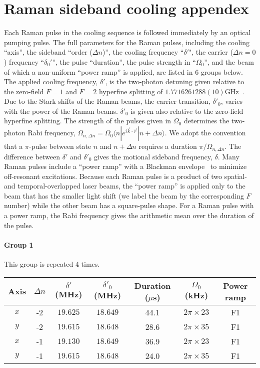 
\chapter{Raman sideband cooling appendex}
\label{appendex:rsc}

Each Raman pulse in the cooling sequence is followed immediately by an optical pumping pulse.
The full parameters for the Raman pulses, including the cooling ``axis'',
the sideband ``order ($\Delta n$)'', the cooling frequency ``$\delta '$",
the carrier ($\Delta n=0$) frequency ``$\delta_0'$'', the pulse ``duration'',
the pulse strength in ``$\Omega_0$'',
and the beam of which a non-uniform ``power ramp'' is applied, are listed in 6 groups below.
The applied cooling frequency, $\delta'$,
is the two-photon detuning given relative to the zero-field $F=1$ and $F=2$ hyperfine splitting
of $1.7716261288(10)$GHz~\cite{steck_sodium_nodate}.
Due to the Stark shifts of the Raman beams, the carrier transition, $\delta'_0$,
varies with the power of the Raman beams.
$\delta'_0$ is given also relative to the zero-field hyperfine splitting.
The strength of the pulses given in $\Omega_0$ determines the two-photon Rabi frequency,
$\Omega_{n,\Delta n}=\Omega_0 \langle n|e^{i \vec{k} \cdot \vec{r}}|n+\Delta n\rangle$.
We adopt the convention that a $\pi$-pulse between state $n$ and $n+\Delta n$ requires a duration $\pi/\Omega_{n,\Delta n}$.
The difference between $\delta'$ and $\delta'_0$ gives the motional sideband frequency, $\delta$.
Many Raman pulses include a ``power ramp'' with a Blackman envelope~\cite{kasevich_laser_1992} to minimize off-resonant excitations.
Because each Raman pulse is a product of two spatial- and temporal-overlapped laser beams,
the ``power ramp'' is applied only to the beam that has the smaller light shift
(we label the beam by the corresponding $F$ number) while the other beam has a square-pulse shape.
For a Raman pulse with a power ramp,
the Rabi frequency gives the arithmetic mean over the duration of the pulse.

\newpage

\subsubsection{Group 1}
This group is repeated 4 times.
\begin{center}
  \begin{tabular}{|c|c|c|c|c|c|c|}
    \hline
    Axis&$\Delta n$&$\delta'$ (MHz)&$\delta'_0$ (MHz)&Duration ($\mu$s)& $\Omega_0$ (kHz)&Power ramp\\\hline
    $x$&-2&$19.625$&$18.649$&44.1&$2\pi\times23$&F1\\\hline
    $y$&-2&$19.615$&$18.648$&28.6&$2\pi\times35$&F1\\\hline
    $x$&-1&$19.130$&$18.649$&36.9&$2\pi\times23$&F1\\\hline
    $y$&-1&$19.615$&$18.648$&24.0&$2\pi\times35$&F1\\\hline
  \end{tabular}
\end{center}

